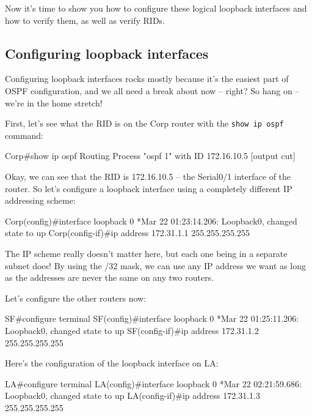 Now it's time to show you how to configure these logical loopback interfaces and how to verify them, as well as verify RIDs.


\subsection{Configuring loopback interfaces}

Configuring loopback interfaces rocks mostly because it's the easiest
part of OSPF configuration, and we all need a break about now -- right?
So hang on -- we're in the home stretch!

First, let's see what the RID is on the Corp router with the
\texttt{show\ ip\ ospf} command:

\begin{cli}
Corp#show ip ospf
Routing Process "ospf 1" with ID 172.16.10.5
[output cut]
\end{cli}

Okay, we can see that the RID is 172.16.10.5 -- the Serial0/1 interface
of the router. So let's configure a loopback interface using a
completely different IP addressing scheme:

\begin{cli}
Corp(config)#interface loopback 0
*Mar 22 01:23:14.206: %
Loopback0, changed state to up
Corp(config-if)#ip address 172.31.1.1 255.255.255.255
\end{cli}

The IP scheme really doesn't matter here, but each one being in a
separate subnet does! By using the /32 mask, we can use any IP address
we want as long as the addresses are never the same on any two routers.

Let's configure the other routers now:

\begin{cli}
SF#configure terminal
SF(config)#interface loopback 0
*Mar 22 01:25:11.206: %
Loopback0, changed state to up
SF(config-if)#ip address 172.31.1.2 255.255.255.255
\end{cli}

Here's the configuration of the loopback interface on LA:

\begin{cli}
LA#configure terminal
LA(config)#interface loopback 0
*Mar 22 02:21:59.686: %
Loopback0, changed state to up
LA(config-if)#ip address 172.31.1.3 255.255.255.255
\end{cli}


